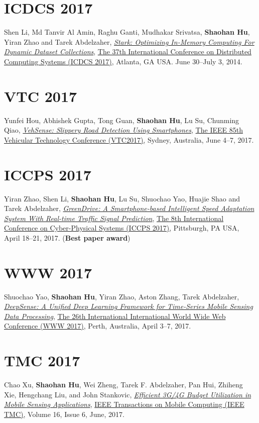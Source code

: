 \section{\sc ICDCS 2017}\hypertarget{li2017icdcs}{}
Shen Li, Md Tanvir Al Amin, Raghu Ganti, Mudhakar Srivatsa, \textbf{Shaohan Hu}, Yiran Zhao and Tarek Abdelzaher,
\href{}{\emph{Stark: Optimizing In-Memory Computing For Dynamic Dataset Collections}},
\href{http://icdcs2017.gatech.edu/}{\textsf{The 37th International Conference on Distributed Computing Systems (ICDCS 2017)}},
Atlanta, GA USA. June 30--July 3, 2014.

\section{\sc VTC 2017}\hypertarget{hou2017vtc}{}
Yunfei Hou, Abhishek Gupta, Tong Guan, \textbf{Shaohan Hu}, Lu Su, Chunming Qiao,
\href{}{\emph{VehSense: Slippery Road Detection Using Smartphones}},
\href{http://ieeevtc.org/vtc2017spring}{\textsf{The IEEE 85th Vehicular Technology Conference (VTC2017)}},
Sydney, Australia, June 4--7, 2017.

\section{\sc ICCPS 2017}\hypertarget{zhao2017iccps}{}
Yiran Zhao, Shen Li, \textbf{Shaohan Hu}, Lu Su, Shuochao Yao, Huajie Shao and Tarek Abdelzaher,
\href{http://dl.acm.org/citation.cfm?id=3055009}{\emph{GreenDrive: A Smartphone-based Intelligent Speed Adaptation System With Real-time Traffic Signal Prediction}},
\href{http://iccps2017.cse.wustl.edu}{\textsf{The 8th International Conference on Cyber-Physical Systems (ICCPS 2017)}},
Pittsburgh, PA USA, April 18--21, 2017. (\textbf{Best paper award})

\section{\sc WWW 2017}\hypertarget{yao2017www}{}
Shuochao Yao, \textbf{Shaohan Hu}, Yiran Zhao, Aston Zhang, Tarek Abdelzaher,
\href{http://dl.acm.org/citation.cfm?id=3052577}{\emph{DeepSense: A Unified Deep Learning Framework for Time-Series Mobile Sensing Data Processing}},
\href{http://www.www2017.com.au/}{\textsf{The 26th International International World Wide Web Conference (WWW 2017)}},
Perth, Australia, April 3--7, 2017.

\section{\sc TMC 2017}\hypertarget{xu2017tmc}{}
Chao Xu, \textbf{Shaohan Hu}, Wei Zheng, Tarek F. Abdelzaher, Pan Hui, Zhiheng Xie, Hengchang Liu, and John Stankovic,
\href{http://ieeexplore.ieee.org/stamp/stamp.jsp?arnumber=7539667}{\emph{Efficient 3G/4G Budget Utilization in Mobile Sensing Applications}},
\href{http://www.computer.org/web/tmc}{\textsf{IEEE Transactions on Mobile Computing (IEEE TMC)}},
Volume 16, Issue 6, June, 2017.

